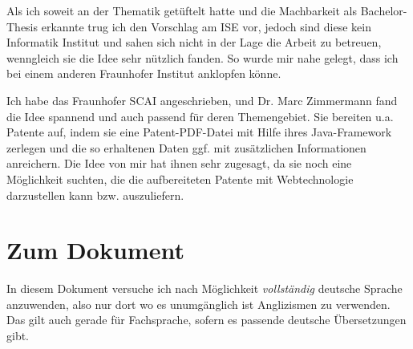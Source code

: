 Als ich soweit an der Thematik getüftelt hatte und die Machbarkeit als
Bachelor-Thesis erkannte trug ich den Vorschlag am ISE vor, jedoch sind
diese kein Informatik Institut und sahen sich nicht in der Lage die Arbeit
zu betreuen, wenngleich sie die Idee sehr nützlich fanden. So wurde mir
nahe gelegt, dass ich bei einem anderen Fraunhofer Institut anklopfen könne.

Ich habe das Fraunhofer SCAI angeschrieben, und Dr. Marc Zimmermann fand
die Idee spannend und auch passend für deren Themengebiet. Sie bereiten u.a.
Patente auf, indem sie eine Patent-PDF-Datei mit Hilfe ihres Java-Framework
zerlegen und die so erhaltenen Daten ggf. mit zusätzlichen Informationen
anreichern. Die Idee von mir hat ihnen sehr zugesagt, da sie noch eine
Möglichkeit suchten, die die aufbereiteten Patente mit Webtechnologie
darzustellen kann bzw. auszuliefern.

\section{Zum Dokument}

In diesem Dokument versuche ich nach Möglichkeit \emph{vollständig}
deutsche Sprache anzuwenden, also nur dort wo es unumgänglich ist
Anglizismen zu verwenden. Das gilt auch gerade für Fachsprache, sofern es
passende deutsche Übersetzungen gibt.

